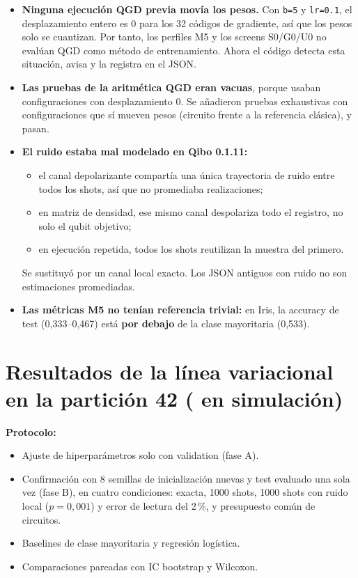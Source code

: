\documentclass[11pt,a4paper]{article}
\begin{document}
\begin{itemize}
  \item \textbf{Ninguna ejecución QGD previa movía los pesos.} Con \texttt{b=5} y \texttt{lr=0.1}, el desplazamiento
        entero es 0 para los 32 códigos de gradiente, así que los pesos solo se cuantizan. Por tanto, los perfiles M5 y
        los screens S0/G0/U0 no evalúan QGD como método de entrenamiento. Ahora el código detecta esta situación,
        avisa y la registra en el JSON.
  \item \textbf{Las pruebas de la aritmética QGD eran vacuas}, porque usaban configuraciones con desplazamiento 0. Se
        añadieron pruebas exhaustivas con configuraciones que sí mueven pesos (circuito frente a la referencia
        clásica), y pasan.
  \item \textbf{El ruido estaba mal modelado en Qibo 0.1.11:}
  \begin{itemize}
    \item el canal depolarizante compartía una única trayectoria de ruido entre todos los shots, así que no promediaba realizaciones;
    \item en matriz de densidad, ese mismo canal despolariza todo el registro, no solo el qubit objetivo;
    \item en ejecución repetida, todos los shots reutilizan la muestra del primero.
  \end{itemize}
  Se sustituyó por un canal local exacto. Los JSON antiguos con ruido no son estimaciones promediadas.
  \item \textbf{Las métricas M5 no tenían referencia trivial:} en Iris, la accuracy de test (0,333--0,467) está
        \textbf{por debajo} de la clase mayoritaria (0,533).
\end{itemize}

\section{Resultados de la línea variacional en la partición 42 ( en simulación)}\label{sec:resultadosB}

\textbf{Protocolo:}
\begin{itemize}
  \item Ajuste de hiperparámetros solo con validation (fase A).
  \item Confirmación con 8 semillas de inicialización nuevas y test evaluado una sola vez (fase B), en cuatro
        condiciones: exacta, 1000 shots, 1000 shots con ruido local ($p=0{,}001$) y error de lectura del 2\,\%, y
        presupuesto común de circuitos.
  \item Baselines de clase mayoritaria y regresión logística.
  \item Comparaciones pareadas con IC bootstrap y Wilcoxon.
\end{itemize}
\end{document}
